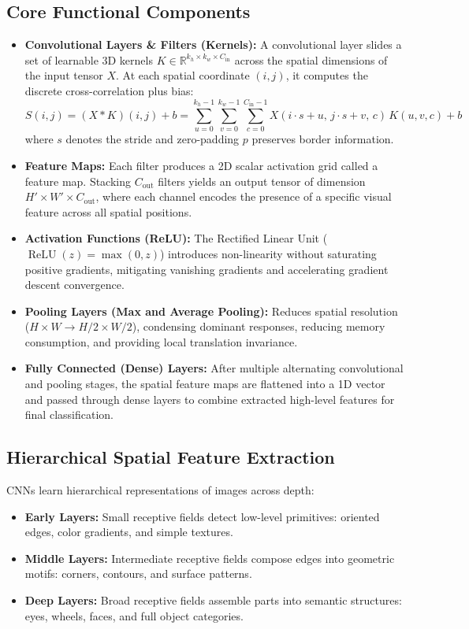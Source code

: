 \documentclass[12pt,a4paper]{article}
\begin{document}
\subsection{Core Functional Components}
\begin{itemize}[leftmargin=*]
\item \textbf{Convolutional Layers \& Filters (Kernels):}
A convolutional layer slides a set of learnable 3D kernels $K \in \mathbb{R}^{k_h \times k_w \times C_{\text{in}}}$ across the spatial dimensions of the input tensor $X$. At each spatial coordinate $(i, j)$, it computes the discrete cross-correlation plus bias:
\begin{equation}
S(i, j) = (X * K)(i, j) + b = \sum_{u=0}^{k_h-1} \sum_{v=0}^{k_w-1} \sum_{c=0}^{C_{\text{in}}-1} X(i \cdot s + u, \, j \cdot s + v, \, c) \, K(u, v, c) + b
\end{equation}
where $s$ denotes the stride and zero-padding $p$ preserves border information.
\item \textbf{Feature Maps:}
Each filter produces a 2D scalar activation grid called a feature map. Stacking $C_{\text{out}}$ filters yields an output tensor of dimension $H' \times W' \times C_{\text{out}}$, where each channel encodes the presence of a specific visual feature across all spatial positions.
\item \textbf{Activation Functions (ReLU):}
The Rectified Linear Unit ($\operatorname{ReLU}(z) = \max(0, z)$) introduces non-linearity without saturating positive gradients, mitigating vanishing gradients and accelerating gradient descent convergence.
\item \textbf{Pooling Layers (Max and Average Pooling):}
Reduces spatial resolution ($H \times W \to H/2 \times W/2$), condensing dominant responses, reducing memory consumption, and providing local translation invariance.
\item \textbf{Fully Connected (Dense) Layers:}
After multiple alternating convolutional and pooling stages, the spatial feature maps are flattened into a 1D vector and passed through dense layers to combine extracted high-level features for final classification.
\end{itemize}

\subsection{Hierarchical Spatial Feature Extraction}
CNNs learn hierarchical representations of images across depth:
\begin{itemize}
    \item \textbf{Early Layers:} Small receptive fields detect low-level primitives: oriented edges, color gradients, and simple textures.
    \item \textbf{Middle Layers:} Intermediate receptive fields compose edges into geometric motifs: corners, contours, and surface patterns.
    \item \textbf{Deep Layers:} Broad receptive fields assemble parts into semantic structures: eyes, wheels, faces, and full object categories.
\end{itemize}
\end{document}
